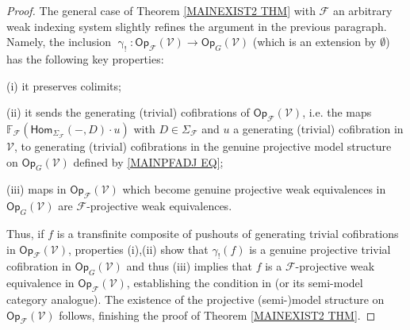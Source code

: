\documentclass[a4paper,10pt
,draft
]{article}%
\numberwithin{equation}{section}
\numberwithin{figure}{section}
\theoremstyle{definition} %
\newcommand{\1}{\ensuremath{\mathbbm 1}}%
\begin{document}
\begin{proof}
  

The general case of Theorem \ref{MAINEXIST2 THM}
with $\mathcal{F}$ an arbitrary weak indexing system
slightly refines the argument in the previous paragraph.
Namely, the inclusion
$\upgamma_! \colon 
\mathsf{Op}_{\mathcal{F}}(\mathcal{V})
\to
\mathsf{Op}_{G}(\mathcal{V})$
(which is an extension by $\emptyset$)
has the following key properties:
\begin{inparaenum}
	\item[(i)] it preserves colimits;
	\item[(ii)] it sends the generating (trivial) cofibrations
	of $\mathsf{Op}_{\mathcal{F}}(\mathcal{V})$,
	i.e. the maps
	$\mathbb{F}_{\mathcal{F}}
	\left(
	\mathsf{Hom}_{\Sigma_{\mathcal{F}}}(-,D) \cdot u
	\right)$
	with $D \in \Sigma_{\mathcal{F}}$
	and $u$ a generating (trivial) cofibration in $\mathcal{V}$,
	to generating (trivial) cofibrations
	in the genuine projective model structure
	on $\mathsf{Op}_G(\mathcal{V})$
	defined by \eqref{MAINPFADJ EQ};
	\item[(iii)] maps in $\mathsf{Op}_{\mathcal{F}}(\mathcal{V})$ which become genuine projective 
	weak equivalences in $\mathsf{Op}_{G}(\mathcal{V})$
	are $\mathcal{F}$-projective weak equivalences.
\end{inparaenum}
	Thus, if $f$ is a transfinite 
	composite of pushouts of generating trivial cofibrations
	in $\mathsf{Op}_{\mathcal{F}}(\mathcal{V})$,
	properties (i),(ii) show that 
	$\gamma_!(f)$
	is a genuine projective trivial cofibration in 
	$\mathsf{Op}_{G}(\mathcal{V})$
	and thus (iii) implies
	that $f$ is a $\mathcal{F}$-projective weak equivalence in
	$\mathsf{Op}_{\mathcal{F}}(\mathcal{V})$,
	establishing the 
	condition in 
	\cite[Thm. 11.3.2(2)]{Hi03} (or its semi-model category analogue).
%
	The existence of the projective (semi-)model structure on $\mathsf{Op}_{\mathcal{F}}(\mathcal{V})$ follows,
	finishing the proof of Theorem \ref{MAINEXIST2 THM}.


\end{proof}
\end{document}
